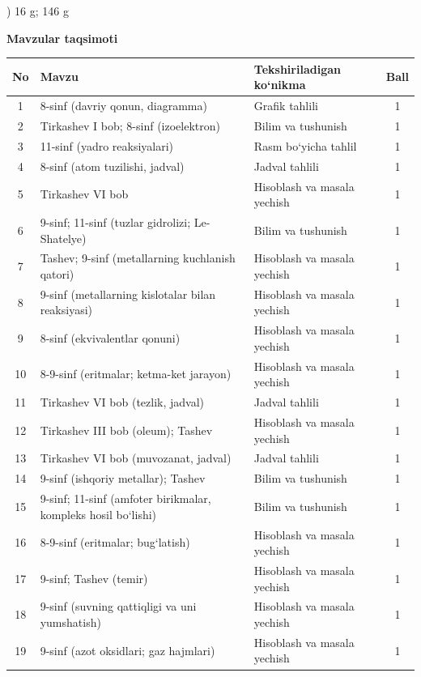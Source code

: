 \documentclass[11pt,a4paper]{article}
\begin{document}
) 16 g; 146 g\par
\par\bigskip\noindent\textbf{Mavzular taqsimoti}\par\smallskip
{\small\noindent\begin{longtable}{|c|p{7.2cm}|p{5.4cm}|c|}\hline \textbf{No} & \textbf{Mavzu} & \textbf{Tekshiriladigan ko`nikma} & \textbf{Ball}\\\hline
1 & 8-sinf (davriy qonun, diagramma) & Grafik tahlili & 1\\\hline
2 & Tirkashev I bob; 8-sinf (izoelektron) & Bilim va tushunish & 1\\\hline
3 & 11-sinf (yadro reaksiyalari) & Rasm bo`yicha tahlil & 1\\\hline
4 & 8-sinf (atom tuzilishi, jadval) & Jadval tahlili & 1\\\hline
5 & Tirkashev VI bob & Hisoblash va masala yechish & 1\\\hline
6 & 9-sinf; 11-sinf (tuzlar gidrolizi; Le-Shatelye) & Bilim va tushunish & 1\\\hline
7 & Tashev; 9-sinf (metallarning kuchlanish qatori) & Hisoblash va masala yechish & 1\\\hline
8 & 9-sinf (metallarning kislotalar bilan reaksiyasi) & Hisoblash va masala yechish & 1\\\hline
9 & 8-sinf (ekvivalentlar qonuni) & Hisoblash va masala yechish & 1\\\hline
10 & 8-9-sinf (eritmalar; ketma-ket jarayon) & Hisoblash va masala yechish & 1\\\hline
11 & Tirkashev VI bob (tezlik, jadval) & Jadval tahlili & 1\\\hline
12 & Tirkashev III bob (oleum); Tashev & Hisoblash va masala yechish & 1\\\hline
13 & Tirkashev VI bob (muvozanat, jadval) & Jadval tahlili & 1\\\hline
14 & 9-sinf (ishqoriy metallar); Tashev & Bilim va tushunish & 1\\\hline
15 & 9-sinf; 11-sinf (amfoter birikmalar, kompleks hosil bo`lishi) & Bilim va tushunish & 1\\\hline
16 & 8-9-sinf (eritmalar; bug`latish) & Hisoblash va masala yechish & 1\\\hline
17 & 9-sinf; Tashev (temir) & Hisoblash va masala yechish & 1\\\hline
18 & 9-sinf (suvning qattiqligi va uni yumshatish) & Hisoblash va masala yechish & 1\\\hline
19 & 9-sinf (azot oksidlari; gaz hajmlari) & Hisoblash va masala yechish & 1\\\hline

\end{longtable}}
\end{document}
